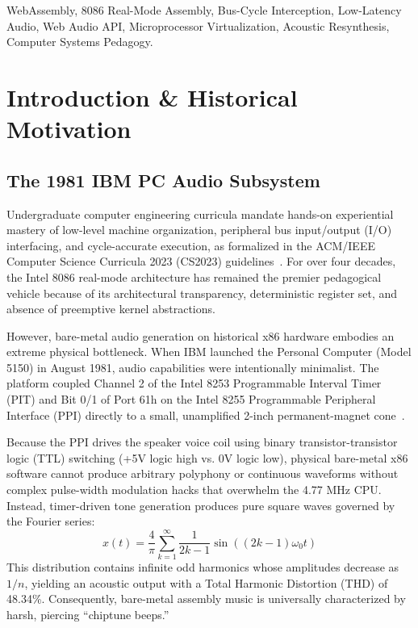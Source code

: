 \documentclass[conference]{IEEEtran}
\begin{document}
\begin{IEEEkeywords}
WebAssembly, 8086 Real-Mode Assembly, Bus-Cycle Interception, Low-Latency Audio, Web Audio API, Microprocessor Virtualization, Acoustic Resynthesis, Computer Systems Pedagogy.
\end{IEEEkeywords}

\section{Introduction \& Historical Motivation}

\subsection{The 1981 IBM PC Audio Subsystem}
Undergraduate computer engineering curricula mandate hands-on experiential mastery of low-level machine organization, peripheral bus input/output (I/O) interfacing, and cycle-accurate execution, as formalized in the ACM/IEEE Computer Science Curricula 2023 (CS2023) guidelines~\cite{cs2023}. For over four decades, the Intel 8086 real-mode architecture has remained the premier pedagogical vehicle because of its architectural transparency, deterministic register set, and absence of preemptive kernel abstractions.

However, bare-metal audio generation on historical x86 hardware embodies an extreme physical bottleneck. When IBM launched the Personal Computer (Model 5150) in August 1981, audio capabilities were intentionally minimalist. The platform coupled Channel 2 of the Intel 8253 Programmable Interval Timer (PIT) and Bit 0/1 of Port 61h on the Intel 8255 Programmable Peripheral Interface (PPI) directly to a small, unamplified 2-inch permanent-magnet cone~\cite{collins2020}.

Because the PPI drives the speaker voice coil using binary transistor-transistor logic (TTL) switching (+5V logic high vs. 0V logic low), physical bare-metal x86 software cannot produce arbitrary polyphony or continuous waveforms without complex pulse-width modulation hacks that overwhelm the 4.77 MHz CPU. Instead, timer-driven tone generation produces pure square waves governed by the Fourier series:
\begin{equation}
x(t) = \frac{4}{\pi} \sum_{k=1}^{\infty} \frac{1}{2k - 1} \sin((2k - 1)\omega_0 t)
\end{equation}
This distribution contains infinite odd harmonics whose amplitudes decrease as $1/n$, yielding an acoustic output with a Total Harmonic Distortion (THD) of 48.34\%. Consequently, bare-metal assembly music is universally characterized by harsh, piercing ``chiptune beeps.''
\end{document}
